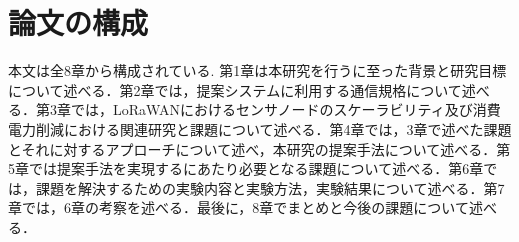 \section{論文の構成}
本文は全8章から構成されている. 第1章は本研究を行うに至った背景と研究目標について述べる．第2章では，提案システムに利用する通信規格について述べる．第3章では，LoRaWANにおけるセンサノードのスケーラビリティ及び消費電力削減における関連研究と課題について述べる．第4章では，3章で述べた課題とそれに対するアプローチについて述べ，本研究の提案手法について述べる．第5章では提案手法を実現するにあたり必要となる課題について述べる．第6章では，課題を解決するための実験内容と実験方法，実験結果について述べる．第7章では，6章の考察を述べる．最後に，8章でまとめと今後の課題について述べる．